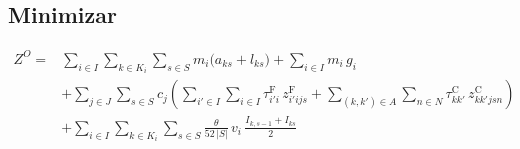 \documentclass[fleqn,12pt,a4paper]{article}
\begin{document}
\subsection*{\textbf{Minimizar}}
\begin{ceqn}
\begin{equation}
\begin{aligned}
Z^{O} = {} & \sum_{i \in I}\sum_{k \in K_i}\sum_{s \in S} m_{i} \bigl( a_{ks} + l_{ks} \bigr)
    + \sum_{i \in I} m_{i}\, g_{i} \\
    & + \sum_{j \in J}\sum_{s \in S} c_{j} \left(
        \sum_{i' \in I}\sum_{i \in I} \tau^{\mathrm{F}}_{i'i}\, z^{\mathrm{F}}_{i'ijs}
        + \sum_{(k,k') \in A}\sum_{n \in N} \tau^{\mathrm{C}}_{kk'}\, z^{\mathrm{C}}_{kk'jsn} \right) \\
    & + \sum_{i \in I}\sum_{k \in K_i}\sum_{s \in S} \frac{\theta}{52\,|S|}\, v_{i}\, \frac{I_{k,s-1} + I_{ks}}{2}
\end{aligned}
\label{eq:obj_turno}
\end{equation}
\end{ceqn}
\end{document}
